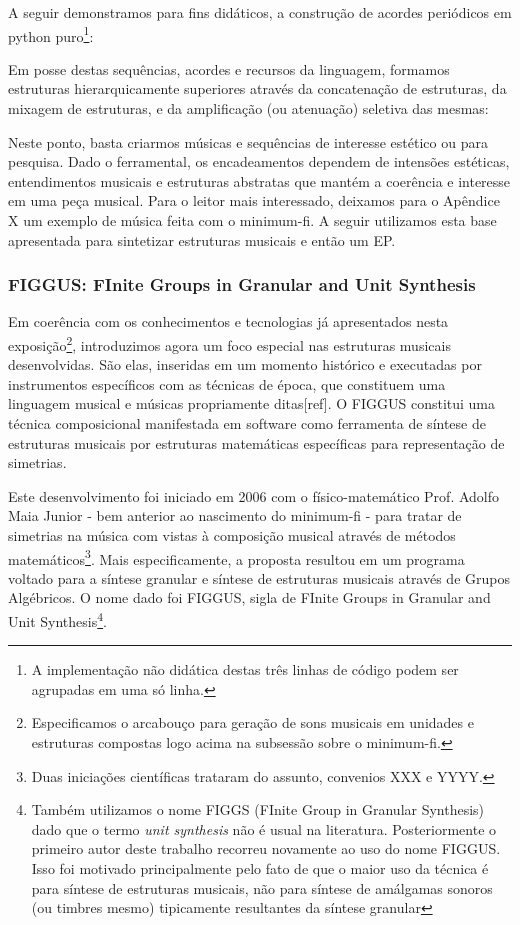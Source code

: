 A seguir demonstramos para fins didáticos, a construção de acordes periódicos em
python puro\footnote{A implementação não didática destas três linhas de código
podem ser agrupadas em uma só linha.}:


Em posse destas sequências, acordes e recursos da linguagem,
formamos estruturas hierarquicamente superiores
através da concatenação de estruturas, da mixagem de estruturas, e da amplificação
(ou atenuação) seletiva das mesmas:


Neste ponto, basta criarmos músicas e sequências de interesse estético ou para pesquisa. Dado o ferramental, os encadeamentos dependem de intensões estéticas, entendimentos musicais e estruturas abstratas que mantém a coerência e interesse em uma peça musical. Para o leitor mais interessado, deixamos para o Apêndice X um exemplo de música feita com o minimum-fi. A seguir utilizamos esta base apresentada para sintetizar estruturas musicais e então um EP.

\vspace{10 mm}

\subsubsection{FIGGUS: FInite Groups in Granular and Unit Synthesis}

Em coerência com os conhecimentos
e tecnologias já apresentados nesta exposição\footnote{Especificamos o arcabouço para geração de sons musicais em unidades
e estruturas compostas logo acima na subsessão sobre o minimum-fi.}, introduzimos agora
um foco especial nas estruturas musicais
desenvolvidas. São elas, inseridas em um momento histórico e
executadas por instrumentos específicos com as técnicas de época,
que constituem uma linguagem musical e músicas propriamente
ditas[ref]. O FIGGUS constitui uma técnica composicional
manifestada em software como ferramenta de síntese de
estruturas musicais por estruturas matemáticas específicas
para representação de simetrias.

Este desenvolvimento foi iniciado em 2006 com o físico-matemático Prof. Adolfo Maia Junior - bem anterior
ao nascimento do minimum-fi - para
tratar de simetrias na música com vistas à composição musical através
de métodos matemáticos\footnote{Duas iniciações científicas trataram do assunto, convenios XXX e YYYY.}. Mais especificamente, a proposta resultou em
um programa voltado para a síntese
granular e síntese de estruturas musicais através de Grupos Algébricos. O nome dado
foi FIGGUS, sigla de FInite Groups in Granular and Unit Synthesis\footnote{Também utilizamos
o nome FIGGS (FInite Group in Granular Synthesis) dado que o termo \emph{unit synthesis} não
é usual na literatura. Posteriormente o primeiro autor deste trabalho recorreu novamente
ao uso do nome FIGGUS. Isso foi motivado principalmente pelo fato de que
o maior uso da técnica é para síntese de estruturas musicais, não para
síntese de amálgamas sonoros (ou timbres mesmo) tipicamente resultantes da síntese granular}.

